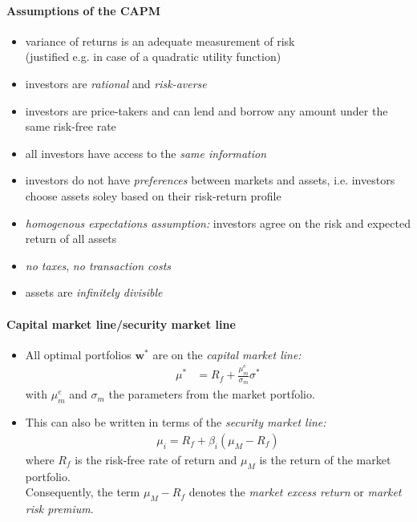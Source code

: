 \documentclass[a4paper,landscape,8pt,fleqn]{scrartcl}
\begin{document}
\begin{multicols*}{3}
\paragraph{Assumptions of the CAPM}
\begin{itemize}
\item variance of returns is an adequate measurement of risk \\
(justified e.g. in case of a quadratic utility function)
\item investors are \textit{rational} and \textit{risk-averse}
\item investors are price-takers and can lend and borrow any amount under the same risk-free rate
\item all investors have access to the \textit{same information}
\item investors do not have \textit{preferences} between markets and assets, i.e. investors choose assets soley based on their risk-return profile
\item \textit{homogenous expectations assumption:} investors agree on the risk and expected return of all assets
\item \textit{no taxes}, \textit{no transaction costs}
\item assets are \textit{infinitely divisible}
\end{itemize}

\paragraph{Capital market line/security market line}
\begin{itemize}
\item All optimal portfolios $\bm w^\ast$ are on the \textit{capital market line:}
\begin{align*}
\mu^\ast &= R_f + \frac{\mu_m^e}{\sigma_m} \sigma^\ast
\end{align*}
with $\mu_m^e$ and $\sigma_m$ the parameters from the market portfolio.
\item This can also be written in terms of the \textit{security market line:}
\begin{align*}
\mu_i = R_f + \beta_i (\mu_M - R_f)
\end{align*}
where $R_f$ is the risk-free rate of return and $\mu_M$ is the return of the market portfolio. \\
Consequently, the term $\mu_M - R_f$ denotes the \textit{market excess return} or \textit{market risk premium}.
\end{itemize}


\end{multicols*}
\end{document}
